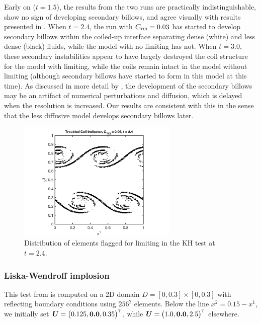\documentclass[letterpaper]{jpconf}
\newcommand{\vect}[1]{\boldsymbol{#1}}
\newcommand{\trans}{\textnormal{\tiny\textsc{T}}}
\newcommand{\TCI}{\textnormal{\tiny\textsc{TCI}}}
\begin{document}
Early on ($t=1.5$), the results from the two runs are practically indistinguishable, show no sign of developing secondary billows, and agree visually with results presented in \cite{mcnally_etal_2012}.  
When $t=2.4$, the run with $C_{\TCI}=0.03$ has started to develop secondary billows within the coiled-up interface separating dense (white) and less dense (black) fluids, while the model with no limiting has not.  
When $t=3.0$, these secondary instabilities appear to have largely destroyed the coil structure for the model with limiting, while the coils remain intact in the model without limiting (although secondary billows have started to form in this model at this time).  
As discussed in more detail by \cite{mcnally_etal_2012}, the development of the secondary billows may be an artifact of numerical perturbations and diffusion, which is delayed when the resolution is increased.  
Our results are consistent with this in the sense that the less diffusive model develops secondary billows later.  

\begin{figure}
  \includegraphics[width=18pc]{./Figures/KelvinHelmholtz_TCI_24_Astronum_2018}
  \caption{\label{fig:KelvinHelmholtz_TCI}Distribution of elements flagged for limiting in the KH test at $t=2.4$.}
\end{figure}

\subsubsection{Liska-Wendroff implosion}

This test from \cite{liskaWendroff_2003} is computed on a 2D domain $D=[0,0.3]\times[0,0.3]$ with reflecting boundary conditions using $256^{2}$ elements.  
Below the line $x^{2}=0.15-x^{1}$, we initially set $\vect{U}=\big(0.125,\vect{0.0},0.35\big)^{\trans}$, while $\vect{U}=\big(1.0,\vect{0.0},2.5\big)^{\trans}$ elsewhere.  
\end{document}
